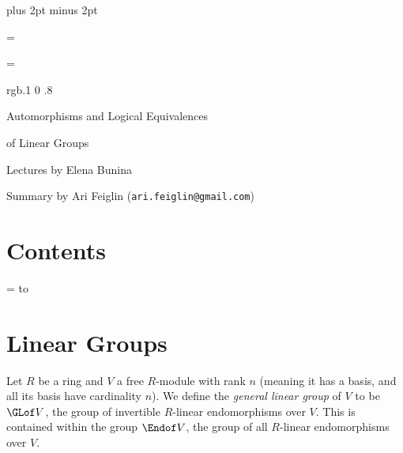 

\parindent=0pt
\parskip=3pt plus 2pt minus 2pt



\def\printmcount{\the\counter{section}.\the\counter{math counter}}

\footline={}


\headline={}

\color rgb{.1 0 .8}

{\def\boxshadowcolor{rgb{.8 .3 .3}}

    \centerline{Automorphisms and Logical Equivalences}
    \centerline{of Linear Groups}
    \smallskip
    \centerline{Lectures by Elena Bunina}
    \centerline{Summary by Ari Feiglin ({\tt ari.feiglin@gmail.com})}

\eppbox

\bigskip

    \section*{Contents}
    
    \tableofcontents
\eppbox

}

\vfill\break

\color{black}

\newif\ifpageodd
\pageoddtrue
\headline={%
    \hbox to \hsize{\color{black}%
        \ifpageodd\hfil{\it\currsubsection\quad\bf\folio}\global\pageoddfalse%
        \else{\bf\folio\quad\it\currsubsection}\hfil\global\pageoddtrue\fi%
    }%
}

\section{Linear Groups}

Let $R$ be a ring and $V$ a free $R$-module with rank $n$ (meaning it has a basis, and all its basis have cardinality $n$).
We define the {\it general linear group} of $V$ to be $\GLof V$, the group of invertible $R$-linear endomorphisms over $V$.
This is contained within the group $\Endof V$, the group of all $R$-linear endomorphisms over $V$.

